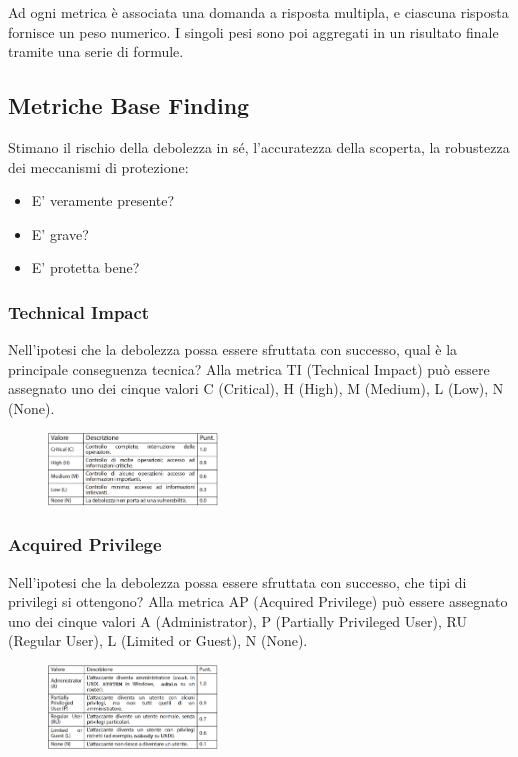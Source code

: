 Ad ogni metrica è associata una domanda
a risposta multipla, e ciascuna risposta fornisce un peso numerico. I singoli pesi sono poi aggregati in un
risultato finale tramite una serie di formule.

\subsection{Metriche Base Finding}
Stimano il rischio della debolezza in sé, l’accuratezza
della scoperta, la robustezza dei meccanismi di
protezione:
\begin{itemize}
    \item E’ veramente presente? 
    \item E’ grave?
    \item E’ protetta bene?  
\end{itemize}
\subsubsection{Technical Impact}
Nell’ipotesi che la debolezza possa essere sfruttata con
successo, qual è la principale conseguenza tecnica? 
Alla metrica TI (Technical Impact) può essere
assegnato uno dei cinque valori
C (Critical), H (High), M (Medium), L (Low), N (None).

\begin{figure}[hbpt!]
    \centering
    \includegraphics[width=0.4\textwidth]{./Images/cap3/3.4.png}
\end{figure}
\FloatBarrier


\subsubsection{Acquired Privilege}
Nell’ipotesi che la debolezza possa essere sfruttata con
successo, che tipi di privilegi si ottengono? Alla metrica AP (Acquired Privilege) può essere
assegnato uno dei cinque valori
A (Administrator), P (Partially Privileged User),
RU (Regular User), L (Limited or Guest), N (None).

\begin{figure}[hbpt!]
    \centering
    \includegraphics[width=0.4\textwidth]{./Images/cap3/3.5.png}
\end{figure}
\FloatBarrier

